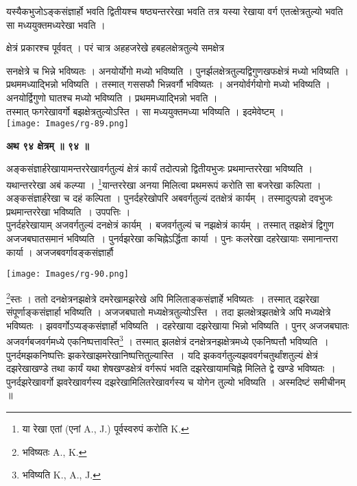 \documentclass[11pt, openany]{book}
\begin{document}
{\ab यस्यैकभुजोऽङ्कसंज्ञार्हो भवति द्वितीयश्च षष्ठ्यन्तररेखा
भवति तत्र यस्या रेखाया वर्ग एतत्क्षेत्रतुल्यो भवति सा
मध्ययुक्तमध्यरेखा भवति । }\\
\vspace{3mm}

 क्षेत्रं प्रकारश्च पूर्ववत् । परं चात्र अहहजरेखे हबहलक्षेत्रतुल्ये
समक्षेत्र 
\begin{vwcol}[widths={0.6,0.4}, sep=.8cm, rule=0pt]
सनक्षेत्रे च भिन्ने भविष्यतः । अनयोर्योगो मध्यो भविष्यति । पुनर्झलक्षेत्रतुल्यद्विगुणखफक्षेत्रं मध्यो भविष्यति । प्रथममध्याद्भिन्नो भविष्यति । तस्मात् गससफौ भिन्नवर्गौ भविष्यतः । अनयोर्वर्गयोगो मध्यो भविष्यति । अनयोर्द्विगुणो घातश्च मध्यो भविष्यति । प्रथममध्याद्भिन्नो भवति । \\
\noindent तस्मात् फगरेखावर्गो बझक्षेत्रतुल्योऽस्ति । सा मध्ययुक्तमध्या भविष्यति । इदमेवेष्टम् । \\
\noindent \texttt{[image: Images/rg-89.png]}\\
\end{vwcol}


\newpage
\begin{center} 
\textbf{\large अथ ९४ क्षेत्रम् ॥ ९४ ॥}
\end{center}
\vspace{1mm}

{\ab अङ्कसंज्ञार्हरेखायामन्तररेखावर्गतुल्यं क्षेत्रं कार्यं तदोत्पन्नो
द्वितीयभुजः प्रथमान्तररेखा भविष्यति । }\\

यथान्तररेखा अबं कल्प्या । \renewcommand{\thefootnote}{१}\footnote{या रेखा एतां (एनां {\en A., J.)} पूर्वस्वरुपं करोति {\en K.}}यान्तररेखा अनया मिलित्वा प्रथमरूपं करोति सा बजरेखा कल्पिता । अङ्कसंज्ञार्हरेखा च दहं कल्पिता ।
पुनर्दहरेखोपरि अबवर्गतुल्यं दतक्षेत्रं कार्यम् । तस्मादुत्पन्नो दवभुजः प्रथमान्तररेखा भविष्यति~। उपपत्तिः ।\\

पुनर्दहरेखायाम् अजवर्गतुल्यं दनक्षेत्रं कार्यम्~। बजवर्गतुल्यं च नझक्षेत्रं कार्यम् । तस्मात् तझक्षेत्रं द्विगुण अजजबघातसमानं भविष्यति~। पुनर्वझरेखा कचिह्नेऽर्द्धिता कार्या ।
पुनः कलरेखा दहरेखायाः समानान्तरा कार्या । अजजबवर्गावङ्कसंज्ञार्हौ \\
\begin{center}
\noindent \texttt{[image: Images/rg-90.png]}\\
\end{center}
\renewcommand{\thefootnote}{2}\footnote{भविष्यतः {\en A., K.}}स्तः । ततो दनक्षेत्रनझक्षेत्रे दमरेखामझरेखे अपि मिलिताङ्कसंज्ञार्हे भविष्यतः~। तस्मात् दझरेखा संपूर्णाङ्कसंज्ञार्हा
भविष्यति । अजजबघातो मध्यक्षेत्रतुल्योऽस्ति~। तदा झलक्षेत्रझतक्षेत्रे
अपि मध्यक्षेत्रे भविष्यतः । झववर्गोऽप्यङ्कसंज्ञार्हो भविष्यति~। दहरेखाया दझरेखाया भिन्नो भविष्यति । पुनर् अजजबघातः अजवर्गबजवर्गमध्ये एकनिष्पत्तावस्ति\renewcommand{\thefootnote}{३}\footnote{भविष्यति {\en K., A., J.}} । तस्मात् झलक्षेत्रं दनक्षेत्रनझक्षेत्रमध्ये एकनिष्पत्तौ भविष्यति~। पुनर्दमझकनिष्पत्तिः झकरेखाझमरेखानिष्पत्तितुल्यास्ति~। यदि झकवर्गतुल्यझववर्गचतुर्थांशतुल्यं
क्षेत्रं दझरेखाखण्डे तथा कार्यं यथा शेषखण्डक्षेत्रं वर्गरूपं भवति दझरेखायामचिह्ने मिलिते द्वे खण्डे भविष्यतः~। पुनर्दझरेखावर्गो
झवरेखावर्गस्य दझरेखामिलितरेखावर्गस्य च योगेन तुल्यो भविष्यति । अस्मदिष्टं
समीचीनम् ॥ 
\end{document}
